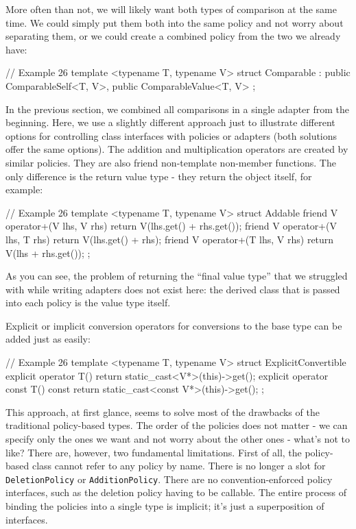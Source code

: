 More often than not, we will likely want both types of comparison at the same time. We could simply put them both into the same policy and not worry about separating them, or we could create a combined policy from the two we already have:

\begin{code}
// Example 26
template <typename T, typename V>
struct Comparable : public ComparableSelf<T, V>,
                    public ComparableValue<T, V> {};
\end{code}

In the previous section, we combined all comparisons in a single adapter from the beginning. Here, we use a slightly different approach just to illustrate different options for controlling class interfaces with policies or adapters (both solutions offer the same options). The addition and multiplication operators are created by similar policies. They are also friend non-template non-member functions. The only difference is the return value type - they return the object itself, for example:

\begin{code}
// Example 26
template <typename T, typename V> struct Addable {
  friend V operator+(V lhs, V rhs) {
    return V(lhs.get() + rhs.get());
  }
  friend V operator+(V lhs, T rhs) {
    return V(lhs.get() + rhs);
  }
  friend V operator+(T lhs, V rhs) {
    return V(lhs + rhs.get());
  }
};
\end{code}

As you can see, the problem of returning the ``final value type'' that we struggled with while writing adapters does not exist here: the derived class that is passed into each policy is the value type itself.

Explicit or implicit conversion operators for conversions to the base type can be added just as easily:

\begin{code}
// Example 26
template <typename T, typename V>
struct ExplicitConvertible {
  explicit operator T() {
    return static_cast<V*>(this)->get();
  }
  explicit operator const T() const {
    return static_cast<const V*>(this)->get();
  }
};
\end{code}

This approach, at first glance, seems to solve most of the drawbacks of the traditional policy-based types. The order of the policies does not matter - we can specify only the ones we want and not worry about the other ones - what's not to like? There are, however, two fundamental limitations. First of all, the policy-based class cannot refer to any policy by name. There is no longer a slot for \texttt{DeletionPolicy} or \texttt{AdditionPolicy}. There are no convention-enforced policy interfaces, such as the deletion policy having to be callable. The entire process of binding the policies into a single type is implicit; it's just a superposition of interfaces.

